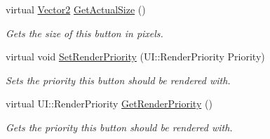 \begin{DoxyCompactItemize}
virtual \hyperlink{classphys_1_1Vector2}{Vector2} \hyperlink{classphys_1_1UI_1_1Button_ab6640af433afe96d5f6bd7016986d73f}{GetActualSize} ()
\begin{DoxyCompactList}\small\item\em Gets the size of this button in pixels. \item\end{DoxyCompactList}\item 
virtual void \hyperlink{classphys_1_1UI_1_1Button_a569053caa70448d560fd016d86ef52cb}{SetRenderPriority} (UI::RenderPriority Priority)
\begin{DoxyCompactList}\small\item\em Sets the priority this button should be rendered with. \item\end{DoxyCompactList}\item 
virtual UI::RenderPriority \hyperlink{classphys_1_1UI_1_1Button_aa17ffbc9b0d4eed151ff5ecbf93d88b8}{GetRenderPriority} ()
\begin{DoxyCompactList}\small\item\em Gets the priority this button should be rendered with. \item\end{DoxyCompactList}\end{DoxyCompactItemize}

